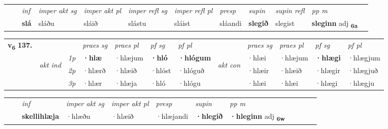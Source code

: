 \begin{tabular}{llllllllllll}
 & & \textit{inf} & \textit{imper akt sg} & \textit{imper akt pl} & \textit{imper refl sg} & \textit{imper refl pl} & \textit{presp} & \textit{supin} & \textit{supin refl} & \textit{pp m}     \\*
  & & \textbf{slá} & sláðu  & sláið & slástu & sláist & sláandi &  \textbf{slegið} & slegist & \textbf{sleginn} adj \textbf{\textsubscript{6a}} \\*
\cmidrule{1-12}
\end{tabular}



\begin{tabular}{llllllllllll} \toprule
\multirow{4}{*}{{{\textbf{v{\textsubscript{6}}} \Large{\textbf{137.}}}}}  & &   &  \textit{praes sg}  & \textit{praes pl}  &\textit{ pf sg} & \textit{pf pl} &  &  \textit{praes sg}  & \textit{praes pl}  & \textit{pf sg} & \textit{pf pl } \\*
	\cmidrule{4-7} \cmidrule{9-12}
 & \multirow{3}{*}{\begin{turn}{90}\textit{akt ind}\end{turn}} & {\textit{1p}} & \textbf{·hlæ} & ·hlæjum    & \textbf{·hló} & \textbf{·hlógum} & \multirow{3}{*}{\begin{turn}{90}\textit{akt con}\end{turn}} &·hlæi & ·hlæjum & \textbf{·hlægi} & ·hlægjum\\*
& &  {\textit{2p}} &  ·hlærð  & ·hlæið   & ·hlóst & ·hlóguð & & ·hlæir & ·hlæið & ·hlægir & ·hlægjuð \\*
& &  {\textit{3p}} & ·hlær & ·hlæja   & ·hló & ·hlógu & & ·hlæi & ·hlæi& ·hlægi & ·hlægju  \\*
\cmidrule{4-7} \cmidrule{9-12}
\end{tabular}


\begin{tabular}{llllllllllll}
 & & \textit{inf} & \textit{imper akt sg} & \textit{imper akt pl}   & \textit{presp} & \textit{supin}  & \textit{pp m}     \\*
  & & \textbf{skellihlæja} & ·hlæðu  & ·hlæið   & ·hlæjandi &  \textbf{·hlegið}  & \textbf{·hleginn} adj \textbf{\textsubscript{6w}} \\*
\cmidrule{1-12}
\end{tabular}



